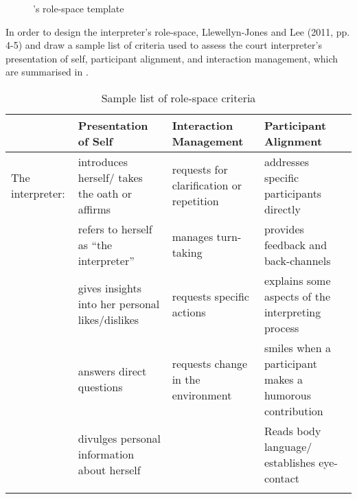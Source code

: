 \documentclass[output=paper]{langsci/langscibook}
\begin{document}
  \begin{figure}
\caption{\citet{Llewellyn-Jones2014}'s role-space template\label{fig:devaux:1}}
\end{figure}

In order to design the interpreter’s role-space, Llewellyn-Jones and Lee (2011, pp. 4-5) and \citet[62]{Llewellyn-Jones2013} draw a sample list of criteria used to assess the court interpreter’s presentation of self, participant alignment, and interaction management, which are summarised in . 

\begin{table}
\begin{tabularx}{\textwidth}{XXXX}
\lsptoprule
& Presentation of Self & Interaction Management & Participant Alignment\\\midrule
 The interpreter: & introduces herself/ takes the oath or affirms & requests for clarification or repetition & addresses specific participants directly\\
& refers to herself as “the interpreter” & manages turn-taking & provides feedback and back-channels\\
& gives insights into her personal likes/dislikes & requests specific actions & explains some aspects of the interpreting process\\
& answers direct questions & requests change in the environment & smiles when a participant makes a humorous contribution\\
& divulges personal information about herself &  & Reads body language/ establishes eye-contact\\
\lspbottomrule
\end{tabularx}
\caption{\label{tab:devaux:1}Sample list of role-space criteria}
\end{table}
\end{document}
